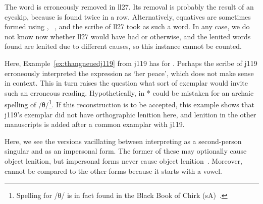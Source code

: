 \begin{mwl}
\end{mwl}
The word  is erroneously removed in \gls{ll27}. Its removal is probably the result of an eyeskip, because  is found twice in a row. Alternatively, equatives are sometimes formed using , \eg {}~\autocite[§~41]{evans_grammar_1964}, and the scribe of \gls{ll27} took  as such a word.  In any case, we do not know now whether \gls{ll27} would have had  or  otherwise, and the lenited words found are lenited due to different causes, so this instance cannot be counted.

\begin{mwl}
\end{mwl}
Here, Example~\ref{ex:thangneuedj119} from \gls{j119} has  for . Perhaps the scribe of \gls{j119} erroneously interpreted the expression as `her peace', which does not make sense in context. This in turn raises the question what sort of exemplar would invite such an erroneous reading. Hypothetically,  in * could be mistaken for an archaic spelling of /θ/\footnote{Spelling  for /θ/ is in fact found in the Black Book of Chirk (\gls{sA})~\autocite[147]{Rus_Scribal95}.}. If this reconstruction is to be accepted, this example shows that \gls{j119}'s exemplar did not have orthographic lenition here, and lenition in the other manuscripts is added after a common examplar with \gls{j119}.

\begin{mwl}
\end{mwl}
Here, we see the versions vacillating between interpreting  as a second-person singular and as an impersonal form. The former of these may optionally cause object lenition, but impersonal forms never cause object lenition~\autocite[67]{van_development14}. Moreover,  cannot be compared to the other forms because it starts with a vowel.

